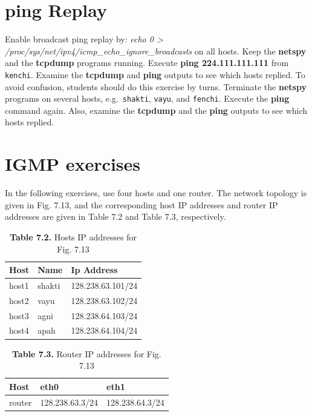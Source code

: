 \documentclass{../UTNetLab}
\begin{document}
\section{ping Replay}
    Enable broadcast ping replay by: \textit{echo 0 > /proc/sys/net/ipv4/icmp\_echo\_ignore\_broadcasts} on all hosts.
    Keep the \textbf{netspy} and the \textbf{tcpdump} programs running.
    Execute \textbf{ping 224.111.111.111} from \texttt{kenchi}.
    Examine the \textbf{tcpdump} and \textbf{ping} outputs to see which hosts replied.
    To avoid confusion, students should do this exercise by turns.
    Terminate the \textbf{netspy} programs on several hosts, e.g.\  \texttt{shakti}, \texttt{vayu}, and \texttt{fenchi}.
    Execute the \textbf{ping} command again.
    Also, examine the \textbf{tcpdump} and the \textbf{ping} outputs to see which hosts replied.

\section*{IGMP exercises}
    In the following exercises, use four hosts and one router. The network topology is given in Fig. 7.13, and the corresponding host IP addresses and router IP addresses are given in Table 7.2 and Table 7.3, respectively.

    \begin{table}[H]
		\caption{\textbf{Table 7.2.} Hosts IP addresses for Fig. 7.13}
		\label{tbl:7.2}
        \vspace{5pt}
        \centering
        \large
        \begin{tabular}{ *3l }
            \hline \hline
            Host & Name & Ip Address \\
            \hline
                host1 & shakti & 128.238.63.101/24 \\
                host2 & vayu   & 128.238.63.102/24 \\
                host3 & agni   & 128.238.64.103/24 \\
                host4 & apah   & 128.238.64.104/24 \\
            \hline \hline
            \end{tabular}
    \end{table}

    \begin{table}[H]
		\caption{\textbf{Table 7.3.} Router IP addresses for Fig. 7.13}
		\label{tbl:7.3}
        \vspace{5pt}
        \centering
        \large
        \begin{tabular}{ *3l }
            \hline \hline
            Host & eth0 & eth1 \\
            \hline
            router & 128.238.63.3/24 & 128.238.64.3/24 \\
            \hline \hline
            \end{tabular}
    \end{table}
\end{document}
